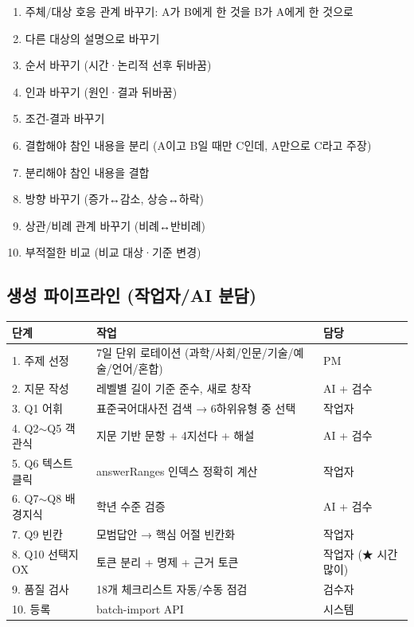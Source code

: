 \documentclass[11pt,a4paper]{article}
\begin{document}
\begin{enumerate}
  \item 주체/대상 호응 관계 바꾸기: A가 B에게 한 것을 B가 A에게 한 것으로
  \item 다른 대상의 설명으로 바꾸기
  \item 순서 바꾸기 (시간·논리적 선후 뒤바꿈)
  \item 인과 바꾸기 (원인·결과 뒤바꿈)
  \item 조건-결과 바꾸기
  \item 결합해야 참인 내용을 분리 (A이고 B일 때만 C인데, A만으로 C라고 주장)
  \item 분리해야 참인 내용을 결합
  \item 방향 바꾸기 (증가↔감소, 상승↔하락)
  \item 상관/비례 관계 바꾸기 (비례↔반비례)
  \item 부적절한 비교 (비교 대상·기준 변경)
\end{enumerate}

\subsection{생성 파이프라인 (작업자/AI 분담)}

\begin{tabularx}{\textwidth}{lXl}
\toprule
\rowcolor{rowbg}\textbf{단계} & \textbf{작업} & \textbf{담당} \\
\midrule
1. 주제 선정 & 7일 단위 로테이션 (과학/사회/인문/기술/예술/언어/혼합) & PM \\
2. 지문 작성 & 레벨별 길이 기준 준수, 새로 창작 & AI + 검수 \\
3. Q1 어휘 & 표준국어대사전 검색 → 6하위유형 중 선택 & 작업자 \\
4. Q2$\sim$Q5 객관식 & 지문 기반 문항 + 4지선다 + 해설 & AI + 검수 \\
5. Q6 텍스트 클릭 & answerRanges 인덱스 정확히 계산 & 작업자 \\
6. Q7$\sim$Q8 배경지식 & 학년 수준 검증 & AI + 검수 \\
7. Q9 빈칸 & 모범답안 → 핵심 어절 빈칸화 & 작업자 \\
8. Q10 선택지 OX & 토큰 분리 + 명제 + 근거 토큰 & 작업자 (★ 시간 많이) \\
9. 품질 검사 & 18개 체크리스트 자동/수동 점검 & 검수자 \\
10. 등록 & batch-import API & 시스템 \\
\bottomrule
\end{tabularx}

\newpage
\end{document}
